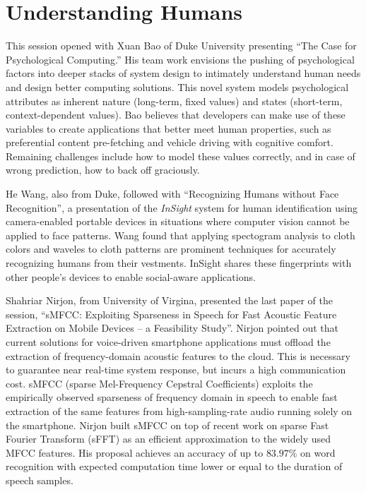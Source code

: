 \section{Understanding Humans}
\label{sec:humans}

This session opened with Xuan Bao of Duke University presenting ``The
Case for Psychological Computing.'' His team work envisions the pushing
of psychological factors into deeper stacks of system design to
intimately understand human needs and design better computing solutions.
This novel system models psychological attributes as inherent nature
(long-term, fixed values) and states (short-term, context-dependent
values).  Bao believes that developers can make use of these variables
to create applications that better meet human properties, such as
preferential content pre-fetching and vehicle driving with cognitive
comfort. Remaining challenges include how to model these values
correctly, and in case of wrong prediction, how to back off graciously.

He Wang, also from Duke, followed with ``Recognizing Humans without Face
Recognition'', a presentation of the \emph{InSight} system for human
identification using camera-enabled portable devices in situations where
computer vision cannot be applied to face patterns. Wang found that
applying spectogram analysis to cloth colors and waveles to cloth
patterns are prominent techniques for accurately recognizing humans from
their vestments. InSight shares these fingerprints with other people's
devices to enable social-aware applications.

Shahriar Nirjon, from University of Virgina, presented the last paper of
the session, ``sMFCC: Exploiting Sparseness in Speech for Fast Acoustic
Feature Extraction on Mobile Devices -- a Feasibility Study''. Nirjon
pointed out that current solutions for voice-driven smartphone
applications must offload the extraction of frequency-domain acoustic
features to the cloud. This is necessary to guarantee near real-time
system response, but incurs a high communication cost. sMFCC (sparse
Mel-Frequency Cepstral Coefficients) exploits the empirically observed
sparseness of frequency domain in speech to enable fast extraction of
the same features from high-sampling-rate audio running solely on the
smartphone. Nirjon built sMFCC on top of recent work on sparse Fast
Fourier Transform (sFFT) as an efficient approximation to the widely
used MFCC features. His proposal achieves an accuracy of up to $83.97\%$
on word recognition with expected computation time lower or equal to the
duration of speech samples.

